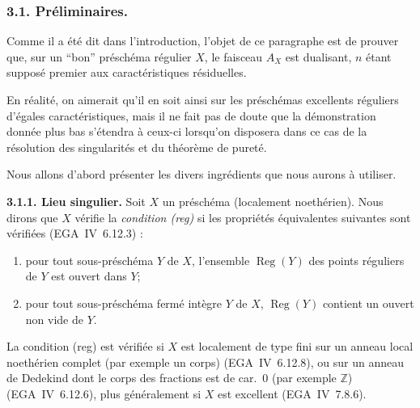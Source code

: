 \documentclass[11pt]{article}
\DeclareMathOperator{\Reg}{Reg}
\newcommand{\Z}{\mathbb{Z}}
\begin{document}
\subsubsection{3.1. Préliminaires.}

Comme il a été dit dans l'introduction, l'objet de ce paragraphe est de prouver que, sur un ``bon'' préschéma régulier $X$, le faisceau $A_X$ est dualisant, $n$ étant supposé premier aux caractéristiques résiduelles.

En réalité, on aimerait qu'il en soit ainsi sur les préschémas excellents réguliers d'égales caractéristiques, mais il ne fait pas de doute que la démonstration donnée plus bas s'étendra à ceux-ci lorsqu'on disposera dans ce cas de la résolution des singularités et du théorème de pureté.

Nous allons d'abord présenter les divers ingrédients que nous aurons à utiliser.

\textbf{3.1.1. Lieu singulier.} Soit $X$ un préschéma (localement noethérien). Nous dirons que $X$ vérifie la \emph{condition (reg)} si les propriétés équivalentes suivantes sont vérifiées (EGA~IV~6.12.3) :
\begin{enumerate}
\item[(i)] pour tout sous-préschéma $Y$ de $X$, l'ensemble $\Reg(Y)$ des points réguliers de $Y$ est ouvert dans $Y$;
\item[(ii)] pour tout sous-préschéma fermé intègre $Y$ de $X$, $\Reg(Y)$ contient un ouvert non vide de $Y$.
\end{enumerate}

La condition (reg) est vérifiée si $X$ est localement de type fini sur un anneau local noethérien complet (par exemple un corps) (EGA~IV~6.12.8), ou sur un anneau de Dedekind dont le corps des fractions est de car.~0 (par exemple $\Z$) (EGA~IV~6.12.6), plus généralement si $X$ est excellent (EGA~IV~7.8.6).
\end{document}
